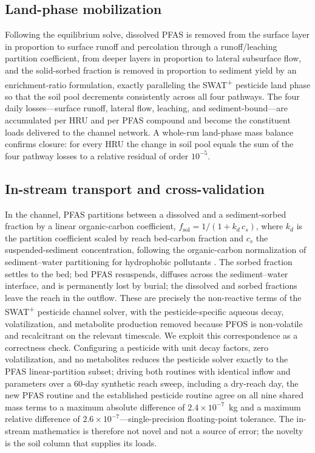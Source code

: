 \subsection{Land-phase mobilization}
Following the equilibrium solve, dissolved PFAS is removed from the surface layer in proportion to surface runoff and percolation through a runoff/leaching partition coefficient, from deeper layers in proportion to lateral subsurface flow, and the solid-sorbed fraction is removed in proportion to sediment yield by an enrichment-ratio formulation, exactly paralleling the SWAT\textsuperscript{+} pesticide land phase so that the soil pool decrements consistently across all four pathways. The four daily losses---surface runoff, lateral flow, leaching, and sediment-bound---are accumulated per HRU and per PFAS compound and become the constituent loads delivered to the channel network. A whole-run land-phase mass balance confirms closure: for every HRU the change in soil pool equals the sum of the four pathway losses to a relative residual of order $10^{-5}$.

\subsection{In-stream transport and cross-validation}
In the channel, PFAS partitions between a dissolved and a sediment-sorbed fraction by a linear organic-carbon coefficient, $f_{\text{sol}}=1/(1+k_d\,c_s)$, where $k_d$ is the partition coefficient scaled by reach bed-carbon fraction and $c_s$ the suspended-sediment concentration, following the organic-carbon normalization of sediment--water partitioning for hydrophobic pollutants \citep{karickhoff1979,chapra1997}. The sorbed fraction settles to the bed; bed PFAS resuspends, diffuses across the sediment--water interface, and is permanently lost by burial; the dissolved and sorbed fractions leave the reach in the outflow. These are precisely the non-reactive terms of the SWAT\textsuperscript{+} pesticide channel solver, with the pesticide-specific aqueous decay, volatilization, and metabolite production removed because PFOS is non-volatile and recalcitrant on the relevant timescale. We exploit this correspondence as a correctness check. Configuring a pesticide with unit decay factors, zero volatilization, and no metabolites reduces the pesticide solver exactly to the PFAS linear-partition subset; driving both routines with identical inflow and parameters over a 60-day synthetic reach sweep, including a dry-reach day, the new PFAS routine and the established pesticide routine agree on all nine shared mass terms to a maximum absolute difference of $2.4\times10^{-7}$~kg and a maximum relative difference of $2.6\times10^{-7}$---single-precision floating-point tolerance. The in-stream mathematics is therefore not novel and not a source of error; the novelty is the soil column that supplies its loads.

